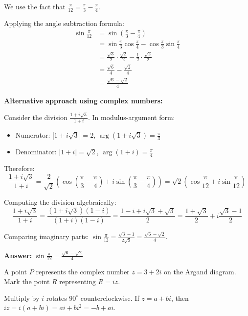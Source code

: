 \begin{solution}[Sketch]
We use the fact that $\frac{\pi}{12} = \frac{\pi}{3} - \frac{\pi}{4}$.

Applying the angle subtraction formula:
\begin{align*}
\sin\frac{\pi}{12} &= \sin\left(\frac{\pi}{3} - \frac{\pi}{4}\right)\\
&= \sin\frac{\pi}{3}\cos\frac{\pi}{4} - \cos\frac{\pi}{3}\sin\frac{\pi}{4}\\
&= \frac{\sqrt{3}}{2} \cdot \frac{\sqrt{2}}{2} - \frac{1}{2} \cdot \frac{\sqrt{2}}{2}\\
&= \frac{\sqrt{6}}{4} - \frac{\sqrt{2}}{4}\\
&= \frac{\sqrt{6}-\sqrt{2}}{4}
\end{align*}

\textbf{Alternative approach using complex numbers:}

Consider the division $\frac{1+i\sqrt{3}}{1+i}$. In modulus-argument form:
\begin{itemize}
\item Numerator: $|1+i\sqrt{3}| = 2$, $\arg(1+i\sqrt{3}) = \frac{\pi}{3}$
\item Denominator: $|1+i| = \sqrt{2}$, $\arg(1+i) = \frac{\pi}{4}$
\end{itemize}

Therefore:
$$\frac{1+i\sqrt{3}}{1+i} = \frac{2}{\sqrt{2}}\left(\cos\left(\frac{\pi}{3}-\frac{\pi}{4}\right) + i\sin\left(\frac{\pi}{3}-\frac{\pi}{4}\right)\right) = \sqrt{2}\left(\cos\frac{\pi}{12} + i\sin\frac{\pi}{12}\right)$$

Computing the division algebraically:
$$\frac{1+i\sqrt{3}}{1+i} = \frac{(1+i\sqrt{3})(1-i)}{(1+i)(1-i)} = \frac{1-i+i\sqrt{3}+\sqrt{3}}{2} = \frac{1+\sqrt{3}}{2} + i\frac{\sqrt{3}-1}{2}$$

Comparing imaginary parts: $\sin\frac{\pi}{12} = \frac{\sqrt{3}-1}{2\sqrt{2}} = \frac{\sqrt{6}-\sqrt{2}}{4}$.

\textbf{Answer:} $\sin \frac{\pi}{12} = \frac{\sqrt{6}-\sqrt{2}}{4}$
\end{solution}

\begin{problem}
A point $P$ represents the complex number 
$z = 3 + 2i$ on the Argand diagram. Mark the point $R$ representing $ R = iz$.
\end{problem}

\begin{hint}
Multiply by $i$ rotates $90^\circ$ counterclockwise. If $z = a + bi$, then $iz = i(a+bi) = ai + bi^2 = -b + ai$.
\end{hint}

